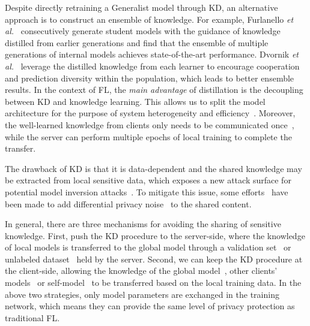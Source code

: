 Despite directly retraining a Generalist model through KD, an alternative approach is to construct an ensemble of knowledge.
For example, Furlanello \textit{et al.}~\cite{furlanello2018born} consecutively generate student models with the guidance of knowledge distilled from earlier generations and find that the ensemble of multiple generations of internal models achieves state-of-the-art performance.
Dvornik \textit{et al.}~\cite{dvornik2019diversity} leverage the distilled knowledge from each learner to encourage cooperation and prediction diversity within the population, which leads to better ensemble results.
In the context of FL, the \emph{main advantage} of distillation is the decoupling between KD and knowledge learning. 
This allows us to split the model architecture for the purpose of system heterogeneity and efficiency~\cite{vepakomma2019split, thapa2022splitfed}.
Moreover, the well-learned knowledge from clients only needs to be communicated once~\cite{gong2021ensemble, gong2022preserving}, while the server can perform multiple epochs of local training to complete the transfer.

The drawback of KD is that it is data-dependent and the shared knowledge may be extracted from local sensitive data, which exposes a new attack surface for potential model inversion attacks~\cite{kim2020multiple, fredrikson2015model}.
To mitigate this issue, some efforts~\cite{wang2022fedkc, fan2022private} have been made to add differential privacy noise~\cite{dwork2006differential} to the shared content.

In general, there are three mechanisms for avoiding the sharing of sensitive knowledge.
First, push the KD procedure to the server-side, where the knowledge of local models is transferred to the global model through a validation set~\cite{sui2020feded} or unlabeled dataset~\cite{lin2020ensemble, guha2018one, chen2020fedbe, xie2023perada, cho2022heterogeneous} held by the server.
Second, we can keep the KD procedure at the client-side, allowing the knowledge of the global model~\cite{yao2019towards, wu2022communication,li2021model, lee2022preservation, mendieta2022local, kim2022multi, he2022class, zhang2023navigating}, other clients' models~\cite{jeong2020federated, aketi2024cross, michieli2021prototype, tan2022fedproto} or self-model~\cite{yao2019towards, jiang2020federated, wu2022communication, li2021model, huang2022learn, jin2022personalized, liang2022rscfed} to be transferred based on the local training data.
In the above two strategies, only model parameters are exchanged in the training network, which means they can provide the same level of privacy protection as traditional FL.


